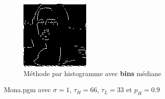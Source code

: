 \documentclass{article}
\begin{document}
\begin{figure}[H]
\begin{subfigure}[b]{0.45\linewidth}
    \end{subfigure}
    \begin{subfigure}[b]{0.45\linewidth}
        \centering
        \includegraphics[scale = 1]{TpIFT6150-2-mona_binMED.png}
        \caption{Méthode par histogramme avec \textbf{bins} médiane}
    \end{subfigure}
    \caption{Mona.pgm avec $\sigma = 1$, $\tau_H = 66$, $\tau_L = 33$ et $p_H = 0.9$}
\end{figure}
\end{document}
